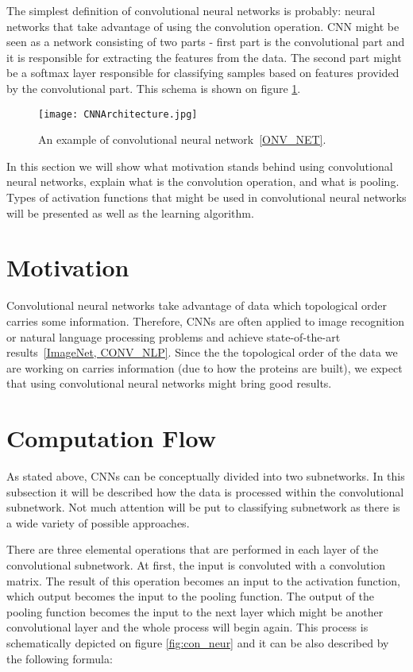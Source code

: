 \documentclass[a4paper,10pt]{report}
\begin{document}
      The simplest definition of convolutional neural networks is probably: neural networks that take advantage of using the convolution operation. CNN might be seen as a network consisting of two parts - first part is the convolutional part and it is responsible for extracting the features from the data. The second part might be a softmax layer responsible for classifying samples based on features provided by the convolutional part. This schema is shown on figure \ref{fig:con_network}. 
      
     \begin{figure}[h!] %
	  \centering
	  \texttt{[image: CNNArchitecture.jpg]}
	  \caption{An example of convolutional neural network~\ref{ONV_NET}.}
	  \label{fig:con_network}
	\end{figure} 
      
      In this section we will show what motivation stands behind using convolutional neural networks, explain what is the convolution operation, and what is pooling. Types of activation functions that might be used in convolutional neural networks
      will be presented as well as the learning algorithm. 
      
      \section{Motivation}
	Convolutional neural networks take advantage of data which topological order carries some information. Therefore, CNNs are often applied to image recognition or natural language processing problems and achieve state-of-the-art results~\ref{ImageNet, CONV_NLP}. Since the the topological order of the data we are working on carries information (due to how the proteins are built), we expect that using convolutional neural networks might bring good results. 
	
      \section{Computation Flow}
	As stated above, CNNs can be conceptually divided into two subnetworks. In this subsection it will be described how the data is processed within the convolutional subnetwork. Not much attention will be put to classifying subnetwork as there is a wide variety of possible approaches. 
	
	There are three elemental operations that are performed in each layer of the convolutional subnetwork. At first, the input is convoluted with a convolution matrix. The result of this operation becomes an input to the activation function, which output becomes the input to the pooling function. The output of the pooling function becomes the input to the next layer which might be another convolutional layer and the whole process will begin again. This process is schematically depicted on figure \ref{fig:con_neur} and it can be also described by the following formula: 
	
\end{document}
